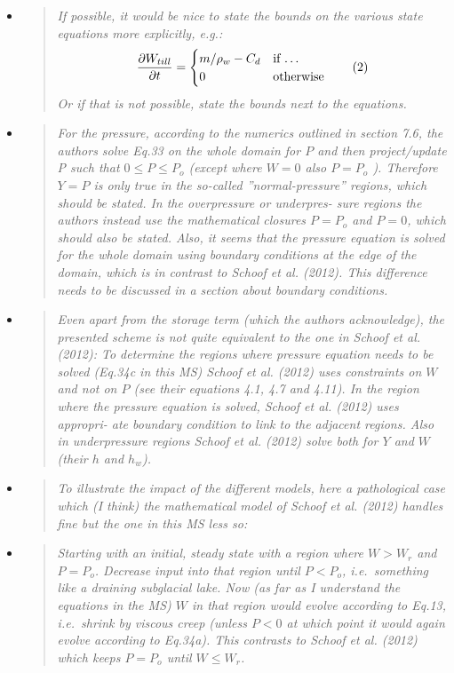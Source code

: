 \documentclass[11pt,reqno]{amsart}
\newcommand{\reply}[2]{
\medskip\medskip
\item  \begin{quote}
\emph{#1}
\end{quote}

\medskip
\noindent #2}
\begin{document}
\begin{itemize}
\reply{If possible, it would be nice to state the bounds on the various state equations more
explicitly, e.g.:
  $$\frac{\partial W_{till}}{\partial t} = \begin{cases} m /\rho_w - C_d & \text{if \dots} \\
  0 & \text{otherwise}  \end{cases} \qquad (2)$$
Or if that is not possible, state the bounds next to the equations.}
{}

\reply{For the pressure, according to the numerics outlined in section 7.6, the authors solve
Eq.33 on the whole domain for $P$ and then project/update P such that $0 \le P \le P_o$
(except where $W = 0$ also $P = P_o$ ). Therefore $Y = P$ is only true in the so-called
''normal-pressure'' regions, which should be stated. In the overpressure or underpres-
sure regions the authors instead use the mathematical closures $P = P_o$ and $P = 0$,
which should also be stated. Also, it seems that the pressure equation is solved for
the whole domain using boundary conditions at the edge of the domain, which is in
contrast to Schoof et al. (2012). This difference needs to be discussed in a section
about boundary conditions.}
{}

\reply{Even apart from the storage term (which the authors acknowledge), the presented
scheme is not quite equivalent to the one in Schoof et al. (2012): To determine the
regions where pressure equation needs to be solved (Eq.34c in this MS) Schoof et al.
(2012) uses constraints on $W$ and not on $P$ (see their equations 4.1, 4.7 and 4.11). In
the region where the pressure equation is solved, Schoof et al. (2012) uses appropri-
ate boundary condition to link to the adjacent regions.  Also in underpressure regions
Schoof et al. (2012) solve both for $Y$ and $W$ (their $h$ and $h_w$).}
{}

\reply{To illustrate the impact of the different models, here a pathological case which (I think)
the mathematical model of Schoof et al. (2012) handles fine but the one in this MS less
so:}
{}

\reply{Starting with an initial, steady state with a region where $W > W_r$ and $P = P_o$.  Decrease input into that region until $P < P_o$, i.e.~something like a draining subglacial lake.
Now (as far as I understand the equations in the MS) $W$ in that region would evolve
according to Eq.13, i.e.~shrink by viscous creep (unless $P < 0$ at which point it would
again evolve according to Eq.34a). This contrasts to Schoof et al. (2012) which keeps
$P = P_o$ until $W \le W_r$.}
{}


\end{itemize}
\end{document}
